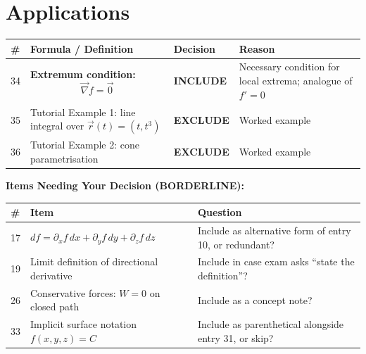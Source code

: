 \documentclass[11pt,a4paper]{article}
\newcommand{\inc}{\textbf{\textcolor{incgreen}{INCLUDE}}}
\newcommand{\exc}{\textbf{\textcolor{exred}{EXCLUDE}}}
\newcommand{\bord}{\textbf{\textcolor{borderorange}{BORDERLINE}}}
\begin{document}
\section{Applications}

\begin{longtable}{p{0.5cm} p{7.5cm} p{2.2cm} p{3.5cm}}
\toprule
\# & Formula / Definition & Decision & Reason \\
\midrule
\endhead

34 & \textbf{Extremum condition:}
\[
  \vec{\nabla}f = \vec{0}
\]
& \inc & Necessary condition for local extrema; analogue of $f'=0$ \\[10pt]

35 & Tutorial Example 1: line integral over $\vec{r}(t)=(t,t^3)$ & \exc & Worked example \\[6pt]

36 & Tutorial Example 2: cone parametrisation & \exc & Worked example \\[6pt]

\bottomrule
\end{longtable}

\vspace{1em}
\begin{mdframed}[backgroundcolor=orange!10]
\textbf{Items Needing Your Decision (\bord):}

\begin{tabular}{p{0.5cm} p{5cm} p{8cm}}
\toprule
\# & Item & Question \\
\midrule
17 & $df = \partial_x f\,dx + \partial_y f\,dy + \partial_z f\,dz$ & Include as alternative form of entry 10, or redundant? \\[8pt]
19 & Limit definition of directional derivative & Include in case exam asks ``state the definition''? \\[8pt]
26 & Conservative forces: $W=0$ on closed path & Include as a concept note? \\[8pt]
33 & Implicit surface notation $f(x,y,z)=C$ & Include as parenthetical alongside entry 31, or skip? \\[4pt]
\bottomrule
\end{tabular}
\end{mdframed}
\end{document}
